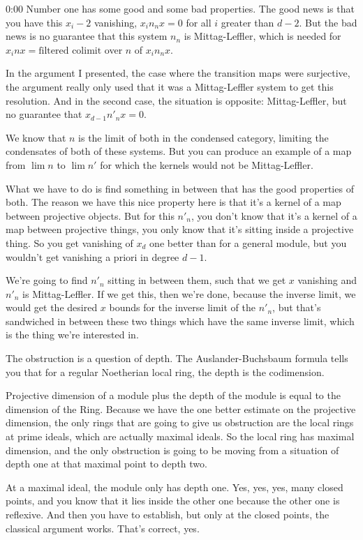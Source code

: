 \begin{unfinished}{0:00}
Number one has some good and some bad properties. The good news is that you have this $x_i - 2$ vanishing, $x_i n_n x = 0$ for all $i$ greater than $d - 2$. But the bad news is no guarantee that this system $n_n$ is Mittag-Leffler, which is needed for $x_i n x = \text{filtered colimit}$ over $n$ of $x_i n_n x$. 

In the argument I presented, the case where the transition maps were surjective, the argument really only used that it was a Mittag-Leffler system to get this resolution. And in the second case, the situation is opposite: Mittag-Leffler, but no guarantee that $x_{d-1} n'_n x = 0$. 

We know that $n$ is the limit of both in the condensed category, limiting the condensates of both of these systems. But you can produce an example of a map from $\lim n$ to $\lim n'$ for which the kernels would not be Mittag-Leffler.

What we have to do is find something in between that has the good properties of both. The reason we have this nice property here is that it's a kernel of a map between projective objects. But for this $n'_n$, you don't know that it's a kernel of a map between projective things, you only know that it's sitting inside a projective thing. So you get vanishing of $x_d$ one better than for a general module, but you wouldn't get vanishing a priori in degree $d-1$. 

We're going to find $n'_n$ sitting in between them, such that we get $x$ vanishing and $n'_n$ is Mittag-Leffler. If we get this, then we're done, because the inverse limit, we would get the desired $x$ bounds for the inverse limit of the $n'_n$, but that's sandwiched in between these two things which have the same inverse limit, which is the thing we're interested in.

The obstruction is a question of depth. The Auslander-Buchsbaum formula tells you that for a regular Noetherian local ring, the depth is the codimension.

Projective dimension of a module plus the depth of the module is equal to the dimension of the Ring. Because we have the one better estimate on the projective dimension, the only rings that are going to give us obstruction are the local rings at prime ideals, which are actually maximal ideals. So the local ring has maximal dimension, and the only obstruction is going to be moving from a situation of depth one at that maximal point to depth two.

At a maximal ideal, the module only has depth one. Yes, yes, yes, many closed points, and you know that it lies inside the other one because the other one is reflexive. And then you have to establish, but only at the closed points, the classical argument works. That's correct, yes.


\end{unfinished}
